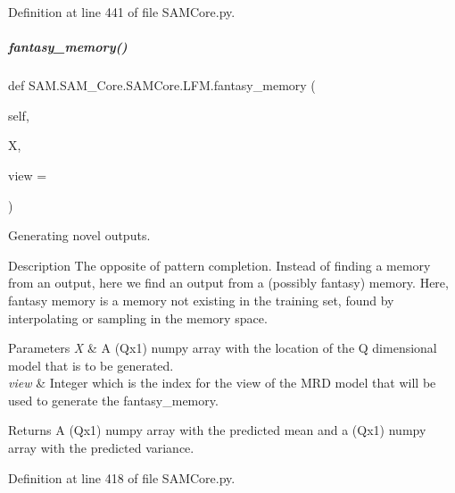 Definition at line 441 of file S\+A\+M\+Core.\+py.

\mbox{\label{group__icubclient__SAM__Core_a8b7f765623ba4d691b54de19128f7641}} 
\subparagraph{\texorpdfstring{fantasy\+\_\+memory()}{fantasy\_memory()}}
{\footnotesize\ttfamily def S\+A\+M.\+S\+A\+M\+\_\+\+Core.\+S\+A\+M\+Core.\+L\+F\+M.\+fantasy\+\_\+memory (\begin{DoxyParamCaption}\item[{}]{self,  }\item[{}]{X,  }\item[{}]{view = {} }\end{DoxyParamCaption})}



Generating novel outputs. 

\begin{DoxyParagraph}{Description}
The opposite of pattern completion. Instead of finding a memory from an output, here we find an output from a (possibly fantasy) memory. Here, fantasy memory is a memory not existing in the training set, found by interpolating or sampling in the memory space.
\end{DoxyParagraph}

\begin{DoxyParams}{Parameters}
{\em X} & A {\ttfamily (Qx1)} numpy array with the location of the {\ttfamily Q} dimensional model that is to be generated. \\
\hline
{\em view} & Integer which is the index for the view of the M\+RD model that will be used to generate the fantasy\+\_\+memory. \\
\hline
\end{DoxyParams}
\begin{DoxyReturn}{Returns}
A {\ttfamily (Qx1)} numpy array with the predicted mean and a {\ttfamily (Qx1)} numpy array with the predicted variance. 
\end{DoxyReturn}


Definition at line 418 of file S\+A\+M\+Core.\+py.

